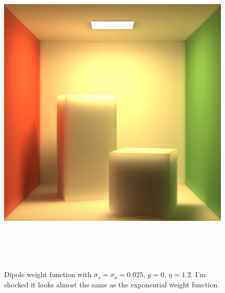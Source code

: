 \documentclass[10pt]{article}
\begin{document}
\begin{figure}[h]
	\centering
	\includegraphics[height=160mm]{dipole.png}
	\caption{Dipole weight function with $\sigma_s = \sigma_a = 0.025$, $g = 0$, $\eta = 1.2$. I'm shocked it looks almost the same as the exponential weight function.}
\end{figure}
\end{document}
